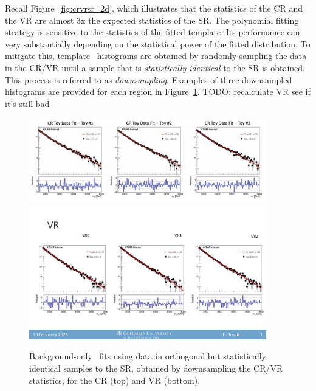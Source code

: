 Recall Figure~\ref{fig:crvrsr_2d}, which illustrates that the statistics of the CR and the VR are almost 3x the expected statistics of the SR.
The polynomial fitting strategy is sensitive to the statistics of the fitted template.
Its performance can very substantially depending on the statistical power of the fitted distribution.
To mitigate this, template \mt~histograms are obtained by randomly sampling the data in the CR/VR until a sample that is \textit{statistically identical} to the SR is obtained.
This process is referred to as \textit{downsampling}.
Examples of three downsampled histograms are provided for each region in Figure~\ref{fig:bkgfit_data}.
TODO: recalculate VR see if it's still bad
\begin{figure}[!htbp]
\centering
   \includegraphics[width=0.92\textwidth]{figures/stats/bkgfit_data_cr}
   \includegraphics[width=0.92\textwidth]{figures/stats/bkgfit_data_vr}
    \caption{Background-only \mt~fits using data in orthogonal but statistically identical samples to the SR, obtained by downsampling the CR/VR statistics, for the CR (top) and VR (bottom).
    \label{fig:bkgfit_data}}
\end{figure}

